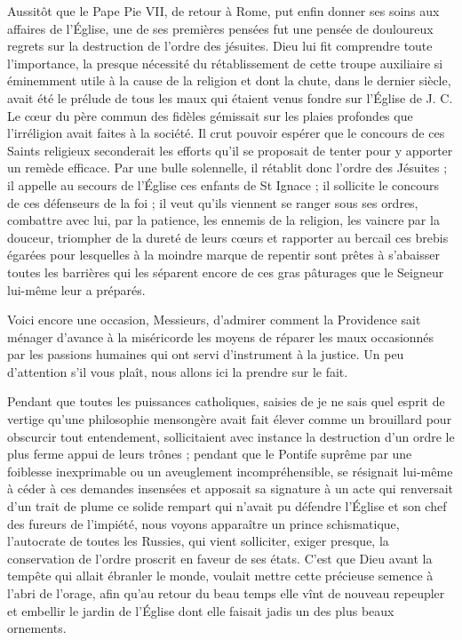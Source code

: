Aussitôt que le Pape Pie VII, de retour à Rome, put enfin donner ses soins aux affaires de l'Église, une de ses premières pensées fut une pensée de douloureux regrets sur la destruction de l'ordre des jésuites. Dieu lui fit comprendre toute l'importance, la presque nécessité du rétablissement de cette troupe auxiliaire si éminemment utile à la cause de la religion et dont la chute,
dans le dernier siècle, avait été le prélude de tous les maux qui étaient venus fondre sur l'Église de J. C. Le cœur du père commun des fidèles gémissait sur les plaies profondes que l'irréligion avait faites à la société. Il crut pouvoir espérer que le concours de ces Saints religieux seconderait les efforts qu'il se proposait de tenter pour y apporter un remède efficace. Par une bulle solennelle, il rétablit donc l'ordre des Jésuites ; il appelle au secours de l'Église ces enfants de St Ignace ; il sollicite le concours de ces défenseurs de la foi ; il veut qu'ils viennent se ranger sous ses ordres, combattre avec lui, par la patience, les ennemis de la religion, les vaincre par la douceur, triompher de la dureté de leurs cœurs et rapporter au bercail ces brebis égarées pour lesquelles à la moindre marque de repentir sont prêtes à s'abaisser toutes les barrières qui les séparent encore de ces gras pâturages que le Seigneur lui-même leur a préparés.

Voici encore une occasion, Messieurs, d'admirer comment la Providence sait ménager d'avance à la miséricorde les moyens de réparer les maux occasionnés par les passions humaines qui ont servi d'instrument à la justice. Un peu d'attention s'il vous plaît, nous allons ici la prendre sur le fait.

Pendant que toutes les puissances catholiques, saisies de je ne sais quel esprit de vertige qu'une philosophie mensongère avait fait élever comme un brouillard pour obscurcir tout entendement, sollicitaient avec instance la destruction d'un ordre le plus ferme appui de leurs trônes ; pendant que le Pontife suprême par une foiblesse inexprimable ou un aveuglement incompréhensible, se résignait lui-même à céder à ces demandes insensées et apposait sa signature à un acte
qui renversait d'un trait de plume ce solide rempart qui n'avait pu défendre l'Église et son chef des fureurs de l'impiété, nous voyons apparaître un prince schismatique, l'autocrate de toutes les Russies, qui vient solliciter, exiger presque, la conservation de l'ordre proscrit en faveur de ses états. C'est que Dieu avant la tempête qui allait ébranler le monde, voulait mettre cette précieuse semence à l'abri de l'orage, afin qu'au retour du beau temps elle vînt de nouveau repeupler et embellir le jardin de l'Église dont elle faisait jadis un des plus beaux ornements.

